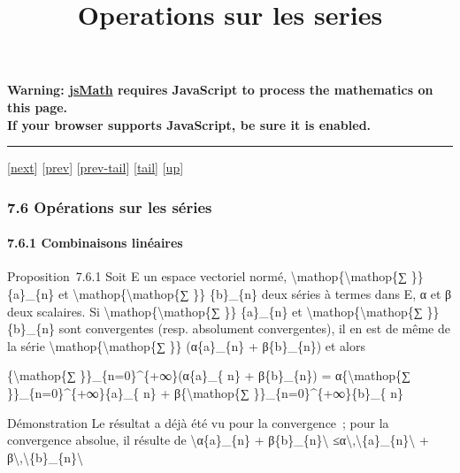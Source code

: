 \documentclass[]{article}
\title{Operations sur les series}
\author{}
\date{}
\begin{document}
\maketitle

\textbf{Warning: \href{http://www.math.union.edu/locate/jsMath}{jsMath}
requires JavaScript to process the mathematics on this page.\\ If your
browser supports JavaScript, be sure it is enabled.}

\begin{center}\rule{3in}{0.4pt}\end{center}

{[}\href{coursse41.html}{next}{]} {[}\href{coursse39.html}{prev}{]}
{[}\href{coursse39.html\#tailcoursse39.html}{prev-tail}{]}
{[}\hyperref[tailcoursse40.html]{tail}{]}
{[}\href{coursch8.html\#coursse40.html}{up}{]}

\subsubsection{7.6 Opérations sur les séries}

\paragraph{7.6.1 Combinaisons linéaires}

Proposition~7.6.1 Soit E un espace vectoriel normé,
\textbackslash{}mathop\{\textbackslash{}mathop\{∑ \}\} \{a\}\_\{n\} et
\textbackslash{}mathop\{\textbackslash{}mathop\{∑ \}\} \{b\}\_\{n\} deux
séries à termes dans E, α et β deux scalaires. Si
\textbackslash{}mathop\{\textbackslash{}mathop\{∑ \}\} \{a\}\_\{n\} et
\textbackslash{}mathop\{\textbackslash{}mathop\{∑ \}\} \{b\}\_\{n\} sont
convergentes (resp. absolument convergentes), il en est de même de la
série \textbackslash{}mathop\{\textbackslash{}mathop\{∑ \}\}
(α\{a\}\_\{n\} + β\{b\}\_\{n\}) et alors

\{\textbackslash{}mathop\{∑ \}\}\_\{n=0\}\^{}\{+∞\}(α\{a\}\_\{ n\} +
β\{b\}\_\{n\}) = α\{\textbackslash{}mathop\{∑
\}\}\_\{n=0\}\^{}\{+∞\}\{a\}\_\{ n\} + β\{\textbackslash{}mathop\{∑
\}\}\_\{n=0\}\^{}\{+∞\}\{b\}\_\{ n\}

Démonstration Le résultat a déjà été vu pour la convergence~; pour la
convergence absolue, il résulte de
\textbackslash{}\textbar{}α\{a\}\_\{n\} +
β\{b\}\_\{n\}\textbackslash{}\textbar{}
≤\textbar{}α\textbar{}\textbackslash{},\textbackslash{}\textbar{}\{a\}\_\{n\}\textbackslash{}\textbar{}
+
\textbar{}β\textbar{}\textbackslash{},\textbackslash{}\textbar{}\{b\}\_\{n\}\textbackslash{}\textbar{}
\end{document}
